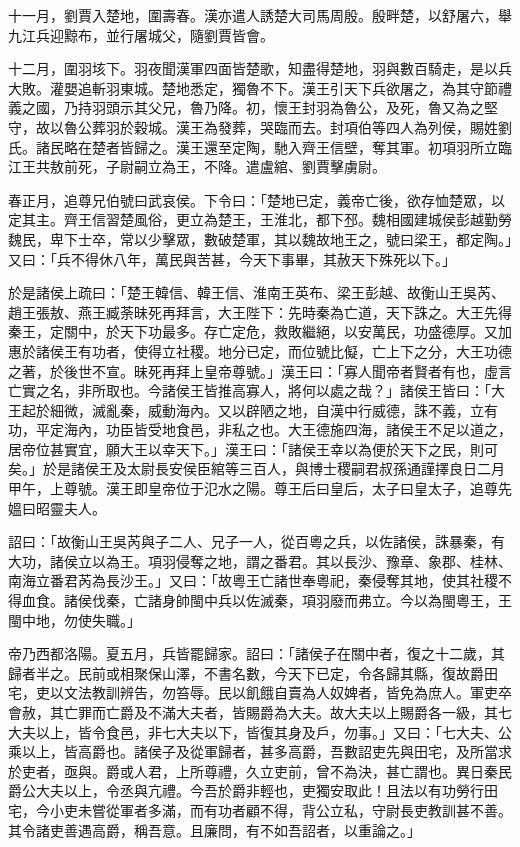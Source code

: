 \begin{pinyinscope}
十一月，劉賈入楚地，圍壽春。漢亦遣人誘楚大司馬周殷。殷畔楚，以舒屠六，舉九江兵迎黥布，並行屠城父，隨劉賈皆會。

十二月，圍羽垓下。羽夜聞漢軍四面皆楚歌，知盡得楚地，羽與數百騎走，是以兵大敗。灌嬰追斬羽東城。楚地悉定，獨魯不下。漢王引天下兵欲屠之，為其守節禮義之國，乃持羽頭示其父兄，魯乃降。初，懷王封羽為魯公，及死，魯又為之堅守，故以魯公葬羽於穀城。漢王為發葬，哭臨而去。封項伯等四人為列侯，賜姓劉氏。諸民略在楚者皆歸之。漢王還至定陶，馳入齊王信壁，奪其軍。初項羽所立臨江王共敖前死，子尉嗣立為王，不降。遣盧綰、劉賈擊虜尉。

春正月，追尊兄伯號曰武哀侯。下令曰：「楚地已定，義帝亡後，欲存恤楚眾，以定其主。齊王信習楚風俗，更立為楚王，王淮北，都下邳。魏相國建城侯彭越勤勞魏民，卑下士卒，常以少擊眾，數破楚軍，其以魏故地王之，號曰梁王，都定陶。」又曰：「兵不得休八年，萬民與苦甚，今天下事畢，其赦天下殊死以下。」

於是諸侯上疏曰：「楚王韓信、韓王信、淮南王英布、梁王彭越、故衡山王吳芮、趙王張敖、燕王臧荼昧死再拜言，大王陛下：先時秦為亡道，天下誅之。大王先得秦王，定關中，於天下功最多。存亡定危，救敗繼絕，以安萬民，功盛德厚。又加惠於諸侯王有功者，使得立社稷。地分已定，而位號比儗，亡上下之分，大王功德之著，於後世不宣。昧死再拜上皇帝尊號。」漢王曰：「寡人聞帝者賢者有也，虛言亡實之名，非所取也。今諸侯王皆推高寡人，將何以處之哉？」諸侯王皆曰：「大王起於細微，滅亂秦，威動海內。又以辟陋之地，自漢中行威德，誅不義，立有功，平定海內，功臣皆受地食邑，非私之也。大王德施四海，諸侯王不足以道之，居帝位甚實宜，願大王以幸天下。」漢王曰：「諸侯王幸以為便於天下之民，則可矣。」於是諸侯王及太尉長安侯臣綰等三百人，與博士稷嗣君叔孫通謹擇良日二月甲午，上尊號。漢王即皇帝位于氾水之陽。尊王后曰皇后，太子曰皇太子，追尊先媼曰昭靈夫人。

詔曰：「故衡山王吳芮與子二人、兄子一人，從百粵之兵，以佐諸侯，誅暴秦，有大功，諸侯立以為王。項羽侵奪之地，謂之番君。其以長沙、豫章、象郡、桂林、南海立番君芮為長沙王。」又曰：「故粵王亡諸世奉粵祀，秦侵奪其地，使其社稷不得血食。諸侯伐秦，亡諸身帥閩中兵以佐滅秦，項羽廢而弗立。今以為閩粵王，王閩中地，勿使失職。」

帝乃西都洛陽。夏五月，兵皆罷歸家。詔曰：「諸侯子在關中者，復之十二歲，其歸者半之。民前或相聚保山澤，不書名數，今天下已定，令各歸其縣，復故爵田宅，吏以文法教訓辨告，勿笞辱。民以飢餓自賣為人奴婢者，皆免為庶人。軍吏卒會赦，其亡罪而亡爵及不滿大夫者，皆賜爵為大夫。故大夫以上賜爵各一級，其七大夫以上，皆令食邑，非七大夫以下，皆復其身及戶，勿事。」又曰：「七大夫、公乘以上，皆高爵也。諸侯子及從軍歸者，甚多高爵，吾數詔吏先與田宅，及所當求於吏者，亟與。爵或人君，上所尊禮，久立吏前，曾不為決，甚亡謂也。異日秦民爵公大夫以上，令丞與亢禮。今吾於爵非輕也，吏獨安取此！且法以有功勞行田宅，今小吏未嘗從軍者多滿，而有功者顧不得，背公立私，守尉長吏教訓甚不善。其令諸吏善遇高爵，稱吾意。且廉問，有不如吾詔者，以重論之。」


\end{pinyinscope}
